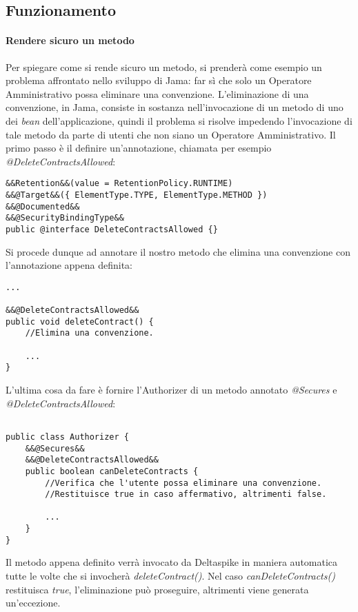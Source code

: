 \subsection{Funzionamento}
\paragraph{Rendere sicuro un metodo}
Per spiegare come si rende sicuro un metodo, si prenderà come esempio un problema affrontato nello sviluppo di Jama: far sì che solo un Operatore Amministrativo possa eliminare una convenzione. L'eliminazione di una convenzione, in Jama, consiste in sostanza nell'invocazione di un metodo di uno dei \textit{bean} dell'applicazione, quindi il problema si risolve impedendo l'invocazione di tale metodo da parte di utenti che non siano un Operatore Amministrativo.\newline
Il primo passo è il definire un'annotazione, chiamata per esempio \textsl{@DeleteContractsAllowed}:

\begin{lstlisting}
&&Retention&&(value = RetentionPolicy.RUNTIME)
&&@Target&&({ ElementType.TYPE, ElementType.METHOD })
&&@Documented&&
&&@SecurityBindingType&&
public @interface DeleteContractsAllowed {}
\end{lstlisting}

Si procede dunque ad annotare il nostro metodo che elimina una convenzione con l'annotazione appena definita:

\begin{lstlisting}
...

&&@DeleteContractsAllowed&&
public void deleteContract() {
	//Elimina una convenzione.
	
	...
}
\end{lstlisting}

L'ultima cosa da fare è fornire l'Authorizer di un metodo annotato \textsl{@Secures} e \textsl{@DeleteContractsAllowed}:

\begin{lstlisting}

public class Authorizer {
	&&@Secures&&
	&&@DeleteContractsAllowed&&
	public boolean canDeleteContracts {
		//Verifica che l'utente possa eliminare una convenzione.
		//Restituisce true in caso affermativo, altrimenti false.
	
		...
	}
}
\end{lstlisting}

Il metodo appena definito verrà invocato da Deltaspike in maniera automatica tutte le volte che si invocherà \textsl{deleteContract()}. Nel caso \textsl{canDeleteContracts()} restituisca \textsl{true}, l'eliminazione può proseguire, altrimenti viene generata un'eccezione.


